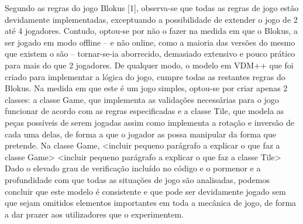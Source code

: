 Segundo as regras do jogo Blokus [1], observa-se que todas as regras de jogo estão devidamente implementadas, exceptuando a possibilidade de extender o jogo de 2 até 4 jogadores. Contudo, optou-se por não o fazer na medida em que o Blokus, a ser jogado em modo offline – e não online, como a maioria das versões do mesmo que existem o são – tornar-se-ia aborrecido, demasiado extensivo e pouco prático para mais do que 2 jogadores.
De qualquer modo, o modelo em VDM++ que foi criado para implementar a lógica do jogo, cumpre todas as restantes regras do Blokus. Na medida em que este é um jogo simples, optou-se por criar apenas 2 classes: a classe Game, que implementa as validações necessárias para o jogo funcionar de acordo com as regras especificadas e a classe Tile, que modela as peças possíveis de serem jogadas assim como implementa a rotação e inversão de cada uma delas, de forma a que o jogador as possa manipular da forma que pretende.
Na classe Game, 
<incluir pequeno parágrafo a explicar o que faz a classe Game>
<incluir pequeno parágrafo a explicar o que faz a classe Tile>
Dado o elevado grau de verificação incluído no código e o pormenor e a profundidade com que todas as situações de jogo são analisadas, podemos concluir que este modelo é consistente e que pode ser devidamente jogado sem que sejam omitidos elementos importantes em toda a mecânica de jogo, de forma a dar prazer aos utilizadores que o experimentem.
